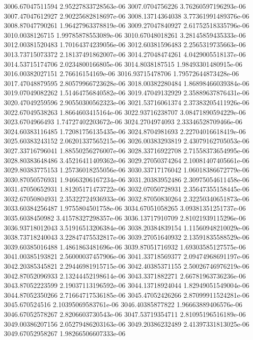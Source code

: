 {3006.67047511594 2.95227833728563e-06
3007.0704756226 3.76260597196293e-06
3007.47047612927 2.90225682818697e-06
3008.13714364038 3.77361991489376e-06
3008.87047790261 1.96427963378819e-06
3009.27047840927 2.61752518335796e-06
3010.0038126715 1.99785878553089e-06
3010.67048018261 3.28145859435333e-06
3012.00381520483 1.70164374239056e-06
3012.60381596483 2.2565319735663e-06
3013.73715073372 2.18137491862007e-06
3014.27048474261 4.0429005518137e-06
3014.53715174706 2.0234800166805e-06
3014.8038187515 1.98493301480915e-06
3016.00382027151 2.76616154169e-06
3016.93715478706 1.79572644873428e-06
3017.47048879595 2.80579966723628e-06
3018.00382280484 1.86898466039384e-06
3019.07049082262 1.51464756840582e-06
3019.47049132929 2.35889637876431e-06
3020.47049259596 2.90550300562323e-06
3021.53716061374 2.37383205411926e-06
3022.67049538263 1.8664603415164e-06
3022.93716238707 3.08471890594229e-06
3023.6704966493 1.74727402203672e-06
3024.2704974093 2.33346528709466e-06
3024.60383116485 1.72081756135435e-06
3024.8704981693 2.22704016618419e-06
3025.60383243152 2.06201337565215e-06
3026.00383293819 2.43079162705053e-06
3027.33716796041 1.88550256276007e-06
3028.33716922708 2.71558373654995e-06
3028.80383648486 3.45216411409362e-06
3029.27050374264 2.10081407405661e-06
3029.80383775153 1.25736018255056e-06
3030.33717176042 1.06018386672779e-06
3030.87050576931 1.94663206167234e-06
3031.20383952486 2.30975054611458e-06
3031.47050652931 1.81205171473722e-06
3032.07050728931 2.35647355158445e-06
3032.67050804931 2.35322724936933e-06
3032.87050830264 2.32250340651873e-06
3033.60384256487 1.9755804501758e-06
3034.67051058265 3.09381351251737e-06
3035.6038450982 3.41578327298357e-06
3036.13717910709 2.81021939115296e-06
3036.93718012043 3.51916513206384e-06
3038.20384839154 1.11560948210029e-06
3038.73718240043 3.22847475532817e-06
3039.27051640932 2.13591835588529e-06
3039.60385016488 1.4861863481696e-06
3039.87051716932 1.69303585127575e-06
3041.00385193821 2.56000037457906e-06
3041.33718569377 2.09474968691197e-06
3042.20385345821 2.29446981915715e-06
3042.40385371155 2.50026746976219e-06
3042.87052096933 2.13244452198614e-06
3043.3371882271 2.66781963736236e-06
3043.87052223599 2.19037113196592e-06
3044.13718924044 1.82949051549004e-06
3044.87052350266 2.71664717536185e-06
3045.47052426266 2.87099911524281e-06
3045.670524516 2.10395069583761e-06
3046.40385877822 1.96663889406576e-06
3046.67052578267 2.8206603730543e-06
3047.53719354711 2.81095196516189e-06
3049.00386207156 2.05279486203163e-06
3049.20386232489 2.41397331813025e-06
3049.67052958267 1.98266506607333e-06
}
